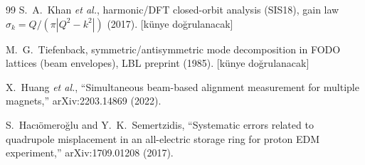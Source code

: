 \documentclass[twocolumn,a4paper,10pt]{article}
\begin{document}
\begin{thebibliography}{99}
S.~A.~Khan \emph{et al.}, harmonic/DFT closed-orbit analysis (SIS18), gain law
$\sigma_k = Q/(\pi|Q^2-k^2|)$ (2017). [künye doğrulanacak]

M.~G.~Tiefenback, symmetric/antisymmetric mode decomposition in FODO lattices
(beam envelopes), LBL preprint (1985). [künye doğrulanacak]

X.~Huang \emph{et al.}, ``Simultaneous beam-based alignment measurement for
multiple magnets,'' arXiv:2203.14869 (2022).

S.~Hac\i{}\"omero\u{g}lu and Y.~K.~Semertzidis, ``Systematic errors related to
quadrupole misplacement in an all-electric storage ring for proton EDM
experiment,'' arXiv:1709.01208 (2017).
\end{thebibliography}
\end{document}
